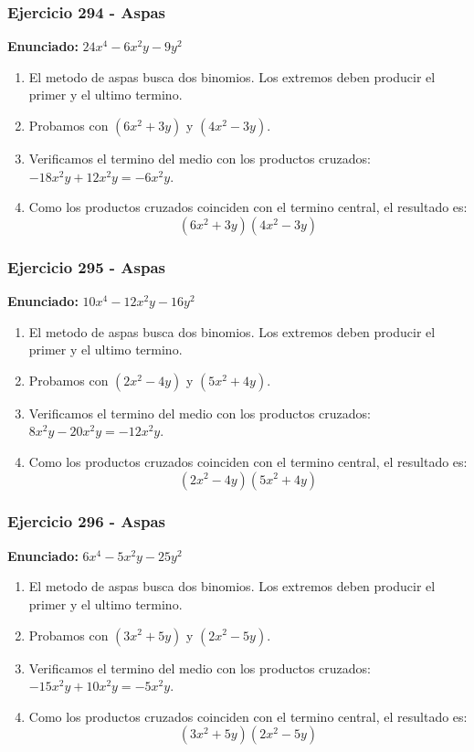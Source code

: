 \documentclass[11pt,a4paper]{article}
\begin{document}
\vspace{0.2cm}
\subsubsection*{Ejercicio 294 - Aspas}
\textbf{Enunciado:} $ 24 x^{4} - 6 x^{2} y - 9 y^{2} $\par
\begin{enumerate}[leftmargin=2em]
\item El metodo de aspas busca dos binomios. Los extremos deben producir el primer y el ultimo termino.
\item Probamos con \((6 x^{2} + 3 y)\) y \((4 x^{2} - 3 y)\).
\item Verificamos el termino del medio con los productos cruzados: \(- 18 x^{2} y+12 x^{2} y=- 6 x^{2} y\).
\item Como los productos cruzados coinciden con el termino central, el resultado es: \[\boxed{\left(6 x^{2} + 3 y\right)\left(4 x^{2} - 3 y\right)}\]
\end{enumerate}

\vspace{0.2cm}
\subsubsection*{Ejercicio 295 - Aspas}
\textbf{Enunciado:} $ 10 x^{4} - 12 x^{2} y - 16 y^{2} $\par
\begin{enumerate}[leftmargin=2em]
\item El metodo de aspas busca dos binomios. Los extremos deben producir el primer y el ultimo termino.
\item Probamos con \((2 x^{2} - 4 y)\) y \((5 x^{2} + 4 y)\).
\item Verificamos el termino del medio con los productos cruzados: \(8 x^{2} y- 20 x^{2} y=- 12 x^{2} y\).
\item Como los productos cruzados coinciden con el termino central, el resultado es: \[\boxed{\left(2 x^{2} - 4 y\right)\left(5 x^{2} + 4 y\right)}\]
\end{enumerate}

\vspace{0.2cm}
\subsubsection*{Ejercicio 296 - Aspas}
\textbf{Enunciado:} $ 6 x^{4} - 5 x^{2} y - 25 y^{2} $\par
\begin{enumerate}[leftmargin=2em]
\item El metodo de aspas busca dos binomios. Los extremos deben producir el primer y el ultimo termino.
\item Probamos con \((3 x^{2} + 5 y)\) y \((2 x^{2} - 5 y)\).
\item Verificamos el termino del medio con los productos cruzados: \(- 15 x^{2} y+10 x^{2} y=- 5 x^{2} y\).
\item Como los productos cruzados coinciden con el termino central, el resultado es: \[\boxed{\left(3 x^{2} + 5 y\right)\left(2 x^{2} - 5 y\right)}\]
\end{enumerate}
\end{document}
